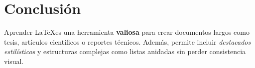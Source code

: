 \documentclass[12pt,a4paper]{article} %
\begin{document}
\section{Conclusión} %
Aprender \LaTeX es una herramienta \textbf{valiosa} para crear documentos largos como tesis, artículos científicos o reportes técnicos. Además, permite incluir \textit{destacados estilísticos} y estructuras complejas como listas anidadas sin perder consistencia visual.  
\end{document}
